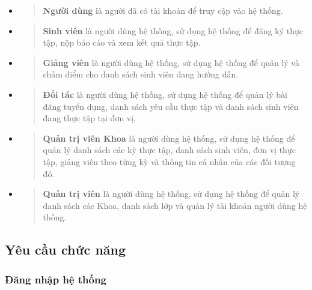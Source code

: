 \documentclass[./../main.tex]{subfiles}
\begin{document}
\begin{itemize}
	\item
	      \begin{quote}
	      	\textbf{Người dùng} là người đã có tài khoản để truy cập vào hệ thống.
	      \end{quote}
	\item
	      \begin{quote}
	      	\textbf{Sinh viên} là người dùng hệ thống, sử dụng hệ thống để đăng ký
	      	thực tập, nộp báo cáo và xem kết quả thực tập.
	      \end{quote}
	\item
	      \begin{quote}
	      	\textbf{Giảng viên} là người dùng hệ thống, sử dụng hệ thống để quản
	      	lý và chấm điểm cho danh sách sinh viên đang hướng dẫn.
	      \end{quote}
	\item
	      \begin{quote}
	      	\textbf{Đối tác} là người dùng hệ thống, sử dụng hệ thống để quản lý
	      	bài đăng tuyển dụng, danh sách yêu cầu thực tập và danh sách sinh viên
	      	đang thực tập tại đơn vị.
	      \end{quote}
	\item
	      \begin{quote}
	      	\textbf{Quản trị viên Khoa} là người dùng hệ thống, sử dụng hệ thống
	      	để quản lý danh sách các kỳ thực tập, danh sách sinh viên, đơn vị thực
	      	tập, giảng viên theo từng kỳ và thông tin cá nhân của các đối tượng
	      	đó.
	      \end{quote}
	\item
	      \begin{quote}
	      	\textbf{Quản trị viên} là người dùng hệ thống, sử dụng hệ thống để
	      	quản lý danh sách các Khoa, danh sách lớp và quản lý tài khoản người
	      	dùng hệ thống.
	      \end{quote}
\end{itemize}

\subsection{Yêu cầu chức năng}

\hypertarget{ux111ux103ng-nhux1eadp-hux1ec7-thux1ed1ng}{%
	\subsubsection{Đăng nhập hệ
		thống}\label{ux111ux103ng-nhux1eadp-hux1ec7-thux1ed1ng}}
  
\end{document}
